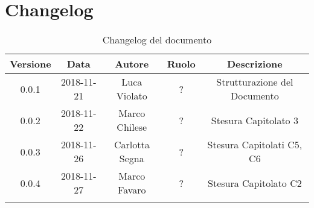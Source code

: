 \section{Changelog}

\begin{center}
\begin{longtable}{|c|c|c|c|c|}
\hline
\textbf{Versione} & \textbf{Data} & \textbf{Autore} & \textbf{Ruolo} & \textbf{Descrizione} \\
\hline \hline
\endfirsthead
0.0.1 & 2018-11-21 & Luca Violato & ? & Strutturazione del Documento \\
0.0.2 & 2018-11-22 & Marco Chilese & ? & Stesura Capitolato 3 \\
0.0.3 & 2018-11-26 & Carlotta Segna & ? & Stesura Capitolati C5, C6 \\
0.0.4 & 2018-11-27 & Marco Favaro & ? & Stesura Capitolato C2 \\
\hline
\caption{Changelog del documento}
\end{longtable}
\end{center}
